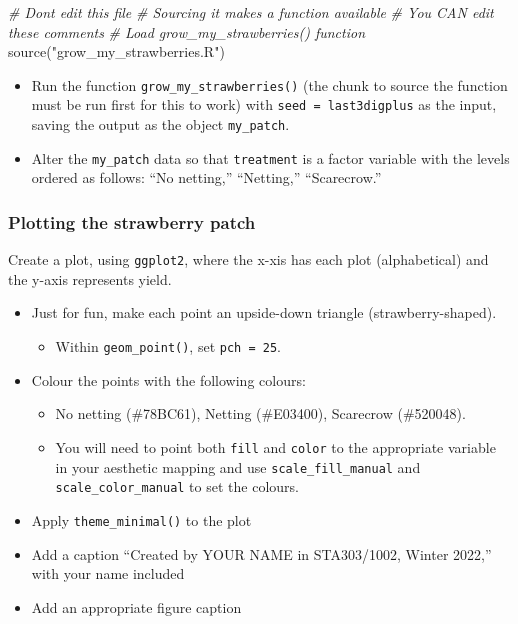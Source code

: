 \documentclass[
  openany]{book}
\newenvironment{Shaded}{\begin{snugshade}}{\end{snugshade}}
\newcommand{\CommentTok}[1]{\textcolor[rgb]{0.56,0.35,0.01}{\textit{#1}}}
\newcommand{\FunctionTok}[1]{\textcolor[rgb]{0.00,0.00,0.00}{#1}}
\newcommand{\NormalTok}[1]{#1}
\newcommand{\StringTok}[1]{\textcolor[rgb]{0.31,0.60,0.02}{#1}}
\providecommand{\tightlist}{%
  \setlength{\itemsep}{0pt}\setlength{\parskip}{0pt}}
\begin{document}
\begin{Shaded}
\begin{Highlighting}[]
\CommentTok{\# Don\textquotesingle{}t edit this file}
\CommentTok{\# Sourcing it makes a function available}
\CommentTok{\# You CAN edit these comments}
\CommentTok{\# Load grow\_my\_strawberries() function}
\FunctionTok{source}\NormalTok{(}\StringTok{"grow\_my\_strawberries.R"}\NormalTok{)}
\end{Highlighting}
\end{Shaded}

\begin{itemize}
\tightlist
\item
  Run the function \texttt{grow\_my\_strawberries()} (the chunk to source the function must be run first for this to work) with \texttt{seed\ =\ last3digplus} as the input, saving the output as the object \texttt{my\_patch}.
\item
  Alter the \texttt{my\_patch} data so that \texttt{treatment} is a factor variable with the levels ordered as follows: ``No netting,'' ``Netting,'' ``Scarecrow.''
\end{itemize}

\hypertarget{plotting-the-strawberry-patch}{%
\subsubsection{Plotting the strawberry patch}\label{plotting-the-strawberry-patch}}

Create a plot, using \texttt{ggplot2}, where the x-xis has each plot (alphabetical) and the y-axis represents yield.

\begin{itemize}
\tightlist
\item
  Just for fun, make each point an upside-down triangle (strawberry-shaped).

  \begin{itemize}
  \tightlist
  \item
    Within \texttt{geom\_point()}, set \texttt{pch\ =\ 25}.\\
  \end{itemize}
\item
  Colour the points with the following colours:

  \begin{itemize}
  \tightlist
  \item
    No netting (\#78BC61), Netting (\#E03400), Scarecrow (\#520048).\\
  \item
    You will need to point both \texttt{fill} and \texttt{color} to the appropriate variable in your aesthetic mapping and use \texttt{scale\_fill\_manual} and \texttt{scale\_color\_manual} to set the colours.
  \end{itemize}
\item
  Apply \texttt{theme\_minimal()} to the plot
\item
  Add a caption ``Created by YOUR NAME in STA303/1002, Winter 2022,'' with your name included
\item
  Add an appropriate figure caption
\end{itemize}
\end{document}
